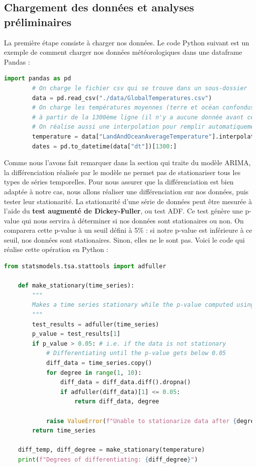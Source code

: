 \documentclass[french]{article}
\begin{document}
    \subsection{Chargement des données et analyses préliminaires}

    La première étape consiste à charger nos données. Le code Python suivant est un exemple de comment charger nos données météorologiques dans une dataframe Pandas :
    \begin{lstlisting}[language=Python]
        import pandas as pd
        # On charge le fichier csv qui se trouve dans un sous-dossier 'data'
        data = pd.read_csv("./data/GlobalTemperatures.csv")
        # On charge les températures moyennes (terre et océan confondus) dans une série de données Pandas,
        # à partir de la 1300ème ligne (il n'y a aucune donnée avant cela).
        # On réalise aussi une interpolation pour remplir automatiquement certaines valeurs manquantes
        temperature = data["LandAndOceanAverageTemperature"].interpolate(limit_direction="backward")[1300:]
        dates = pd.to_datetime(data["dt"])[1300:]
    \end{lstlisting}

    Comme nous l'avons fait remarquer dans la section qui traite du modèle ARIMA, la différenciation réalisée par le modèle ne permet pas de stationariser tous les types de séries temporelles. Pour nous assurer que la différenciation est bien adaptée à notre cas, nous allons réaliser une différenciation sur nos données, puis tester leur stationarité.
    La stationarité d'une série de données peut être mesurée à l'aide du \textbf{test augmenté de Dickey-Fuller}, ou test ADF. Ce test génère une p-value qui nous servira à déterminer si nos données sont stationaires ou non. On comparera cette p-value à un seuil défini à 5\% : si notre p-value est inférieure à ce seuil, nos données sont stationaires. Sinon, elles ne le sont pas. Voici le code qui réalise cette opération en Python :
    \begin{lstlisting}[language=Python]
    from statsmodels.tsa.stattools import adfuller

    def make_stationary(time_series):
        """
        Makes a time series stationary while the p-value computed using the ADF test is higher than 0.05
        """
        test_results = adfuller(time_series)
        p_value = test_results[1]
        if p_value > 0.05: # i.e. if the data is not stationary
            # Differentiating until the p-value gets below 0.05
            diff_data = time_series.copy()
            for degree in range(1, 10):
                diff_data = diff_data.diff().dropna()
                if adfuller(diff_data)[1] <= 0.05:
                    return diff_data, degree
            
            raise ValueError(f"Unable to stationarize data after {degree} times")
        return time_series
    
    diff_temp, diff_degree = make_stationary(temperature)
    print(f"Degrees of differentiating: {diff_degree}")
    \end{lstlisting}
\end{document}
